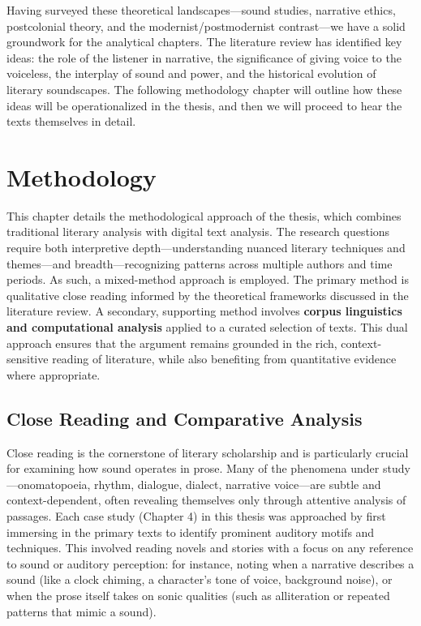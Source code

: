 \documentclass[12pt]{report}
\begin{document}
Having surveyed these theoretical landscapes—sound studies, narrative ethics, postcolonial theory, and the modernist/postmodernist contrast—we have a solid groundwork for the analytical chapters. The literature review has identified key ideas: the role of the listener in narrative, the significance of giving voice to the voiceless, the interplay of sound and power, and the historical evolution of literary soundscapes. The following methodology chapter will outline how these ideas will be operationalized in the thesis, and then we will proceed to hear the texts themselves in detail.

\chapter{Methodology}
This chapter details the methodological approach of the thesis, which combines traditional literary analysis with digital text analysis. The research questions require both interpretive depth—understanding nuanced literary techniques and themes—and breadth—recognizing patterns across multiple authors and time periods. As such, a mixed-method approach is employed. The primary method is qualitative close reading informed by the theoretical frameworks discussed in the literature review. A secondary, supporting method involves \textbf{corpus linguistics and computational analysis} applied to a curated selection of texts. This dual approach ensures that the argument remains grounded in the rich, context-sensitive reading of literature, while also benefiting from quantitative evidence where appropriate.

\section{Close Reading and Comparative Analysis}
Close reading is the cornerstone of literary scholarship and is particularly crucial for examining how sound operates in prose. Many of the phenomena under study—onomatopoeia, rhythm, dialogue, dialect, narrative voice—are subtle and context-dependent, often revealing themselves only through attentive analysis of passages. Each case study (Chapter 4) in this thesis was approached by first immersing in the primary texts to identify prominent auditory motifs and techniques. This involved reading novels and stories with a focus on any reference to sound or auditory perception: for instance, noting when a narrative describes a sound (like a clock chiming, a character’s tone of voice, background noise), or when the prose itself takes on sonic qualities (such as alliteration or repeated patterns that mimic a sound).
\end{document}
